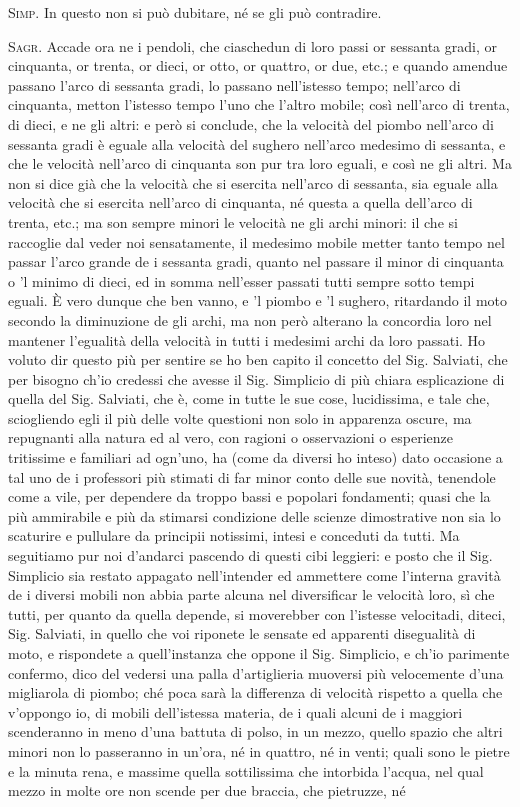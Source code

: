 \documentclass[11pt,twoside,openany]{book}
\newcommand{\speaker}[1]{\textcolor{rubric}{\textsc{#1}}\space}
\begin{document}
\speaker{Simp.} In questo non si può dubitare, né se gli può contradire.

\speaker{Sagr.} Accade ora ne i pendoli, che ciaschedun di loro passi or sessanta gradi, or cinquanta, or trenta, or dieci, or otto, or quattro, or due, etc.; e quando amendue passano l'arco di sessanta gradi, lo passano nell'istesso tempo; nell'arco di cinquanta, metton l'istesso tempo l'uno che l'altro mobile; così nell'arco di trenta, di dieci, e ne gli altri: e però si conclude, che la velocità del piombo nell'arco di sessanta gradi è eguale alla velocità del sughero nell'arco medesimo di sessanta, e che le velocità nell'arco di cinquanta son pur tra loro eguali, e così ne gli altri. Ma non si dice già che la velocità che si esercita nell'arco di sessanta, sia eguale alla velocità che si esercita nell'arco di cinquanta, né questa a quella dell'arco di trenta, etc.; ma son sempre minori le velocità ne gli archi minori: il che si raccoglie dal veder noi sensatamente, il medesimo mobile metter tanto tempo nel passar l'arco grande de i sessanta gradi, quanto nel passare il minor di cinquanta o 'l minimo di dieci, ed in somma nell'esser passati tutti sempre sotto tempi eguali. È vero dunque che ben vanno, e 'l piombo e 'l sughero, ritardando il moto secondo la diminuzione de gli archi, ma non però alterano la concordia loro nel mantener l'egualità della velocità in tutti i medesimi archi da loro passati. Ho voluto dir questo più per sentire se ho ben capito il concetto del Sig. Salviati, che per bisogno ch'io credessi che avesse il Sig. Simplicio di più chiara esplicazione di quella del Sig. Salviati, che è, come in tutte le sue cose, lucidissima, e tale che, sciogliendo egli il più delle volte questioni non solo in apparenza oscure, ma repugnanti alla natura ed al vero, con ragioni o osservazioni o esperienze tritissime e familiari ad ogn'uno, ha (come da diversi ho inteso) dato occasione a tal uno de i professori più stimati di far minor conto delle sue novità, tenendole come a vile, per dependere da troppo bassi e popolari fondamenti; quasi che la più ammirabile e più da stimarsi condizione delle scienze dimostrative non sia lo scaturire e pullulare da principii notissimi, intesi e conceduti da tutti. Ma seguitiamo pur noi d'andarci pascendo di questi cibi leggieri: e posto che il Sig. Simplicio sia restato appagato nell'intender ed ammettere come l'interna gravità de i diversi mobili non abbia parte alcuna nel diversificar le velocità loro, sì che tutti, per quanto da quella depende, si moverebber con l'istesse velocitadi, diteci, Sig. Salviati, in quello che voi riponete le sensate ed apparenti disegualità di moto, e rispondete a quell'instanza che oppone il Sig. Simplicio, e ch'io parimente confermo, dico del vedersi una palla d'artiglieria muoversi più velocemente d'una migliarola di piombo; ché poca sarà la differenza di velocità rispetto a quella che v'oppongo io, di mobili dell'istessa materia, de i quali alcuni de i maggiori scenderanno in meno d'una battuta di polso, in un mezzo, quello spazio che altri minori non lo passeranno in un'ora, né in quattro, né in venti; quali sono le pietre e la minuta rena, e massime quella sottilissima che intorbida l'acqua, nel qual mezzo in molte ore non scende per due braccia, che pietruzze, né 
\end{document}
